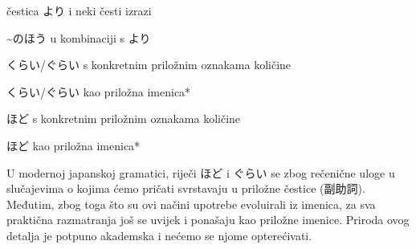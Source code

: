 
\author{Tomislav Mamić}

	
	\begin{hyou}
		\item čestica より i neki česti izrazi
		\item \textasciitilde のほう u kombinaciji s より
		\item くらい/ぐらい s konkretnim priložnim oznakama količine
		\item くらい/ぐらい kao priložna imenica*
		\item ほど s konkretnim priložnim oznakama količine
		\item ほど kao priložna imenica*
	\end{hyou}

	
	U modernoj japanskoj gramatici, riječi ほど i ぐらい se zbog rečenične uloge u slučajevima o kojima ćemo pričati svrstavaju u priložne čestice (副助詞). Međutim, zbog toga što su ovi načini upotrebe evoluirali iz imenica, za sva praktična razmatranja još se uvijek i ponašaju kao priložne imenice. Priroda ovog detalja je potpuno akademska i nećemo se njome opterećivati.
